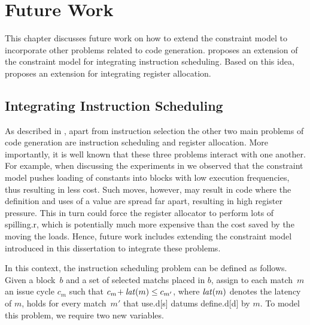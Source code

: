 %

\chapter{Future Work}

This chapter discusses future work on how to extend the \gls{constraint model}
to incorporate other problems related to \gls{code generation}.
%
 proposes an extension of the \gls{constraint model} for
integrating \gls{instruction scheduling}.
%
Based on this idea,  proposes an extension for
integrating \gls{register allocation}.


\section{Integrating Instruction Scheduling}

As described in , apart from \gls{instruction
  selection} the other two main problems of \gls{code generation} are
\gls{instruction scheduling} and \gls{register allocation}.
%
More importantly, it is well known that these three problems interact with one
another.
%
For example, when discussing the experiments in 
we observed that the \gls{constraint model} pushes loading of constants into
\glspl{block} with low execution frequencies, thus resulting in less cost.
%
Such moves, however, may result in code where the definition and uses of a value
are spread far apart, resulting in high \gls{register} pressure.
%
This in turn could force the \gls{register allocator} to perform lots of
\gls{spilling.r}, which is potentially much more expensive than the cost saved
by the moving the loads.
%
Hence, future work includes extending the \gls{constraint model} introduced in
this dissertation to integrate these problems.

In this context, the \gls{instruction scheduling} problem can be defined as
follows.
%
Given a \gls{block}~$b$ and a set of selected \glspl{match} placed in
$b$\hspace{-1pt}, assign to each \gls{match}~$m$ an issue cycle $c_m$ such that
\mbox{$c_m \!+ \operatorname{\textrm{\textit{lat}}}(m) \leq c_{m'}$}, where $\operatorname{\textrm{\textit{lat}}}(m)$ denotes the latency of
$m$\hspace{-1pt}, holds for every \gls{match}~$m'$ that \gls{use.d}[s]
\glspl{datum} \gls{define.d}[d] by $m$\hspace{-1pt}.
%
To model this problem, we require two new \glspl{variable}.


